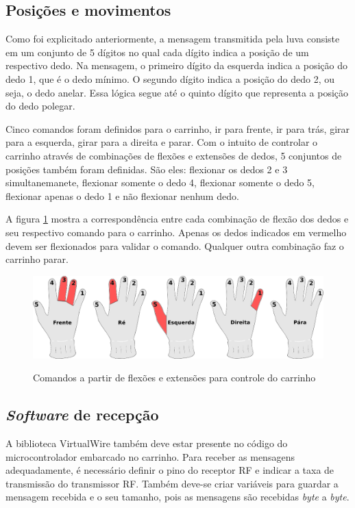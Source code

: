 \documentclass[
	12pt,				%
	openright,			%
	oneside,			%
	a4paper,			%
	english,			%
	brazil				%
	]{abntex2}
\begin{document}
		\subsection{Posições e movimentos}

		Como foi explicitado anteriormente, a mensagem transmitida pela luva consiste em um conjunto de 5 dígitos no qual cada dígito indica a posição de um respectivo dedo. Na mensagem, o primeiro dígito da esquerda indica a posição do dedo 1, que é o dedo mínimo. O segundo dígito indica a posição do dedo 2, ou seja, o dedo anelar. Essa lógica segue até o quinto dígito que representa a posição do dedo polegar.

		Cinco comandos foram definidos para o carrinho, ir para frente, ir para trás, girar para a esquerda, girar para a direita e parar. Com o intuito de controlar o carrinho através de combinações de flexões e extensões de dedos, 5 conjuntos de posições também foram definidas. São eles: flexionar os dedos 2 e 3 simultanemanete, flexionar somente o dedo 4, flexionar somente o dedo 5, flexionar apenas o dedo 1 e não flexionar nenhum dedo.

		A figura \ref{Fig:glove-control-positions1} mostra a correspondência entre cada combinação de flexão dos dedos e seu respectivo comando para o carrinho. Apenas os dedos indicados em vermelho devem ser flexionados para validar o comando. Qualquer outra combinação faz o carrinho parar.


		\begin{figure}[h!]
			\centering
			\caption{Comandos a partir de flexões e extensões para controle do carrinho}
  		\includegraphics[width=14cm]{./figures/glove-control-positions1.png}
  		\label{Fig:glove-control-positions1}
		\end{figure}

		
		\subsection{\textit{Software} de recepção}

		A biblioteca VirtualWire também deve estar presente no código do microcontrolador embarcado no carrinho. Para receber as mensagens adequadamente, é necessário definir o pino do receptor RF e indicar a taxa de transmissão do transmissor RF. Também deve-se criar variáveis para guardar a mensagem recebida e o seu tamanho, pois as mensagens são recebidas \textit{byte} a \textit{byte}.
\end{document}
